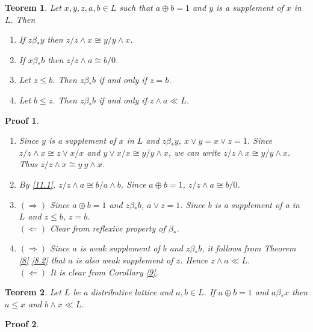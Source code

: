 \documentclass[a4paper,12pt]{article}
\numberwithin{equation}{section}
\theoremstyle{italik}
\newtheorem{teorem}{Teorem}[section]
\newtheorem*{ispat}{Proof}
\begin{document}
\begin{teorem}\label{11}
  Let $ x,y,z,a,b \in L $ such that $ a \oplus b = 1 $ and $ y $ is a supplement of $ x $ in $ L $. Then
  \begin{enumerate}[label=(\roman{*}), ref=(\roman{*})]
    \item
      If $ z \beta_* y $ then $ z / z \wedge x \cong y / y \wedge x $. \label{11.1}
    \item
      If $ x \beta_* b $ then $ z / z \wedge a \cong b / 0 $. \label{11.2}
    \item
      Let $ z \leq b $. Then $ z \beta_* b $ if and only if $ z = b $.\label{11.3}
    \item
      Let $ b \leq z $. Then $ z \beta_* b $ if and only if $ z \wedge a \ll L $.\label{11.4}
  \end{enumerate}
\end{teorem}
\begin{ispat}
  \begin{enumerate}
      \item
        Since $ y $ is a supplement of $ x $ in $ L $ and $ z \beta_* y $, 
        $ x \vee y = x \vee z = 1 $. Since $ z / z  \wedge x \cong z \vee x / x $ and 
        $ y \vee x / x \cong y / y \wedge x $, we can write $ z / z \wedge x \cong y / y \wedge x $. 
        Thus $ z / z \wedge x \cong y \ y \wedge x $.
      \item
        By \ref{11.1}, $ z / z \wedge a \cong b / a \wedge b $. Since $ a \oplus b = 1 $, 
        $ z / z \wedge a \cong b / 0 $.
      \item
        $ ( \Rightarrow ) $ 
        Since $ a \oplus b = 1 $ and $ z \beta_* b $, $ a \vee z = 1 $. Since $ b $ is a supplement of 
        a in $ L $ and $ z \leq b $, $ z = b $. \\
        $ ( \Leftarrow ) $ 
        Clear from reflexive property of $ \beta_* $.
      \item
        $ ( \Rightarrow ) $ 
        Since $ a $ is weak supplement of $ b $ and $ z \beta_* b $, it follows from 
        Theorem \ref{8} \ref{8.2} that $ a $ is also weak supplement of $ z $. Hence $ z \wedge a \ll L $. \\
        $ ( \Leftarrow ) $ 
        It is clear from Corollary \ref{9}.
    \end{enumerate}
\end{ispat}


\begin{teorem}
  Let $ L $ be a distributive lattice and $ a,b \in L $. If $ a \oplus b = 1 $ and $ a \beta_* x $ 
  then $ a \leq x $ and $ b \wedge x \ll L $.
\end{teorem}
\begin{ispat}

\end{ispat}






  
\end{document}

